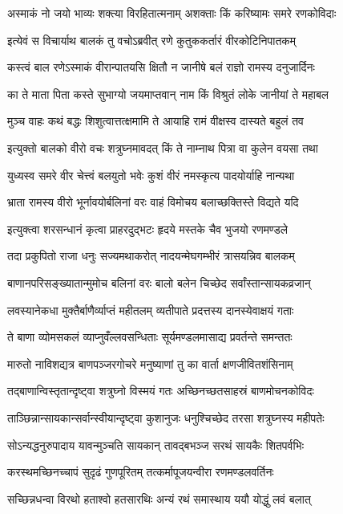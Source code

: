 \twolineshloka
{अस्माकं नो जयो भाव्यः शक्त्या विरहितात्मनाम्}
{अशक्ताः किं करिष्यामः समरे रणकोविदाः}%

\twolineshloka
{इत्येवं स विचार्याथ बालकं तु वचोऽब्रवीत्}
{रणे कुतुककर्तारं वीरकोटिनिपातकम्}%

\twolineshloka
{कस्त्वं बाल रणेऽस्माकं वीरान्पातयसि क्षितौ}
{न जानीषे बलं राज्ञो रामस्य दनुजार्दिनः}%

\twolineshloka
{का ते माता पिता कस्ते सुभाग्यो जयमाप्तवान्}
{नाम किं विश्रुतं लोके जानीयां ते महाबल}%

\twolineshloka
{मुञ्च वाहः कथं बद्धः शिशुत्वात्तत्क्षमामि ते}
{आयाहि रामं वीक्षस्व दास्यते बहुलं तव}%

\twolineshloka
{इत्युक्तो बालको वीरो वचः शत्रुघ्नमावदत्}
{किं ते नाम्नाथ पित्रा वा कुलेन वयसा तथा}%

\twolineshloka
{युध्यस्व समरे वीर चेत्त्वं बलयुतो भवेः}
{कुशं वीरं नमस्कृत्य पादयोर्याहि नान्यथा}%

\twolineshloka
{भ्राता रामस्य वीरो भूर्नावयोर्बलिनां वरः}
{वाहं विमोचय बलाच्छक्तिस्ते विद्यते यदि}%

\twolineshloka
{इत्युक्त्वा शरसन्धानं कृत्वा प्राहरदुद्भटः}
{हृदये मस्तके चैव भुजयो रणमण्डले}%

\twolineshloka
{तदा प्रकुपितो राजा धनुः सज्यमथाकरोत्}
{नादयन्मेघगम्भीरं त्रासयन्निव बालकम्}%

\twolineshloka
{बाणानपरिसङ्ख्यातान्मुमोच बलिनां वरः}
{बालो बलेन चिच्छेद सर्वांस्तान्सायकव्रजान्}%

\twolineshloka
{लवस्यानेकधा मुक्तैर्बाणैर्व्याप्तं महीतलम्}
{व्यतीपाते प्रदत्तस्य दानस्येवाक्षयं गताः}%

\twolineshloka
{ते बाणा व्योमसकलं व्याप्नुवँल्लवसन्धिताः}
{सूर्यमण्डलमासाद्य प्रवर्तन्ते समन्ततः}%

\twolineshloka
{मारुतो नाविशद्यत्र बाणपञ्जरगोचरे}
{मनुष्याणां तु का वार्ता क्षणजीवितशंसिनाम्}%

\twolineshloka
{तद्बाणान्विस्तृतान्दृष्ट्वा शत्रुघ्नो विस्मयं गतः}
{अच्छिनच्छतसाहस्रं बाणमोचनकोविदः}%

\twolineshloka
{ताञ्छिन्नान्सायकान्सर्वान्स्वीयान्दृष्ट्वा कुशानुजः}
{धनुश्चिच्छेद तरसा शत्रुघ्नस्य महीपतेः}%

\twolineshloka
{सोऽन्यद्धनुरुपादाय यावन्मुञ्चति सायकान्}
{तावद्बभञ्ज सरथं सायकैः शितपर्वभिः}%

\twolineshloka
{करस्थमच्छिनच्चापं सुदृढं गुणपूरितम्}
{तत्कर्मापूजयन्वीरा रणमण्डलवर्तिनः}%

\twolineshloka
{सच्छिन्नधन्वा विरथो हताश्वो हतसारथिः}
{अन्यं रथं समास्थाय ययौ योद्धुं लवं बलात्}%

